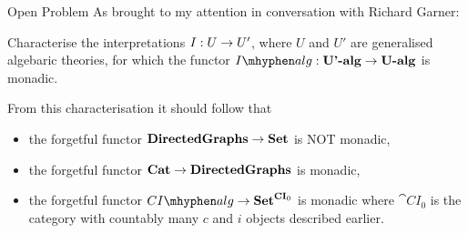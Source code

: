 \begin{frame}{Open Problem}
As brought to my attention in conversation with Richard Garner:

Characterise the interpretations $I: U \rightarrow U'$, where $U$ and $U'$ are generalised algebaric theories,
for which the functor $\Ialg: \cat{U'-alg} \morph \cat{U-alg}$ is monadic.

\medskip
From this characterisation it should follow that 
\begin{itemize}
\item the forgetful functor $\textbf{DirectedGraphs} \rightarrow \textbf{Set}$ is NOT monadic, 
\item the forgetful functor $\textbf{Cat} \rightarrow \textbf{DirectedGraphs}$ is monadic,
\item the forgetful functor $\CIalg \morph \cat{Set}^{\cat{CI}_0}$ is monadic where $\cat{CI}_0$ is the category with countably many $c$ and $i$
objects described earlier. 
\end{itemize}
\end{frame}
